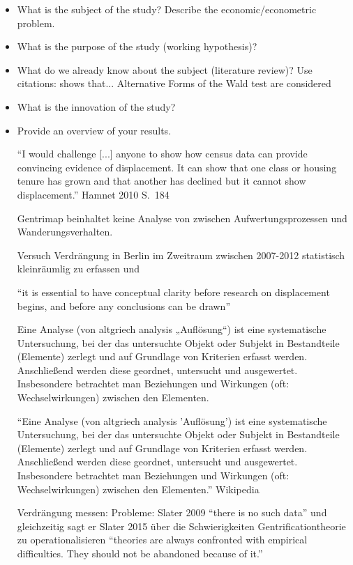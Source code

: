\begin{itemize}

    \item What is the subject of the study? Describe the
        economic/econometric problem.
    \item What is the purpose of the study (working hypothesis)?
    \item What do we already know about the subject (literature
        review)? Use citations: shows that...
        Alternative Forms of the Wald test are considered
    \item What is the innovation of the study?
    \item Provide an overview of your results.
    
"`I would challenge [...] anyone to show how census data can provide convincing evidence of displacement. It can show that one class or housing tenure has grown and that another has declined but it cannot show displacement."' Hamnet 2010 S.~184

Gentrimap beinhaltet keine Analyse von zwischen Aufwertungsprozessen und Wanderungsverhalten.

Versuch Verdrängung in Berlin im Zweitraum zwischen 2007-2012 statistisch kleinräumlig zu erfassen und 


"`it is essential to have conceptual clarity before research on displacement begins, and before any conclusions can be drawn"' \citet[S.~304]{Slater2009}

Eine Analyse (von altgriech analysis „Auflösung“) ist eine systematische Untersuchung, bei der das untersuchte Objekt oder Subjekt in Bestandteile (Elemente) zerlegt und auf Grundlage von Kriterien erfasst werden. Anschließend werden diese geordnet, untersucht und ausgewertet. Insbesondere betrachtet man Beziehungen und Wirkungen (oft: Wechselwirkungen) zwischen den Elementen.

"`Eine Analyse (von altgriech analysis 'Auflösung') ist eine systematische Untersuchung, bei der das untersuchte Objekt oder Subjekt in Bestandteile (Elemente) zerlegt und auf Grundlage von Kriterien erfasst werden. Anschließend werden diese geordnet, untersucht und ausgewertet. Insbesondere betrachtet man Beziehungen und Wirkungen (oft: Wechselwirkungen) zwischen den Elementen."' Wikipedia



Verdrängung messen:
Probleme: Slater 2009 "`there is no such data"' und gleichzeitig sagt er Slater 2015 über die Schwierigkeiten Gentrificationtheorie zu operationalisieren "`theories are always confronted with empirical difficulties. They should not be abandoned because of it."'



\end{itemize}
